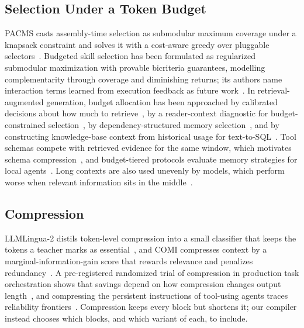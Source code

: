\subsection{Selection Under a Token Budget}
PACMS casts assembly-time selection as submodular maximum coverage under a knapsack constraint and solves it with a
cost-aware greedy over pluggable selectors~\citep{pacms2026}. Budgeted skill selection has been formulated as regularized
submodular maximization with provable bicriteria guarantees, modelling complementarity through coverage and
diminishing returns; its authors name interaction terms learned from execution feedback as future
work~\citep{skillselect2026}. In retrieval-augmented generation, budget allocation has been approached by calibrated
decisions about how much to retrieve~\citep{knowbefore2026}, by a reader-context diagnostic for budget-constrained
selection~\citep{recallnotenough2026}, by dependency-structured memory selection~\citep{contextweaver2026}, and by
constructing knowledge-base context from historical usage for text-to-SQL~\citep{beyondharness2026}. Tool schemas compete
with retrieved evidence for the same window, which motivates schema compression~\citep{toolschema2026}, and budget-tiered
protocols evaluate memory strategies for local agents~\citep{budgetbench2026}. Long contexts are also used unevenly by
models, which perform worse when relevant information sits in the middle~\citep{lostmiddle2024}.

\subsection{Compression}
LLMLingua-2 distils token-level compression into a small classifier that keeps the tokens a teacher marks as
essential~\citep{llmlingua2_2024}, and COMI compresses context by a marginal-information-gain score that rewards relevance
and penalizes redundancy~\citep{comi2026}. A pre-registered randomized trial of compression in production task orchestration
shows that savings depend on how compression changes output length~\citep{compressiontrial2026}, and compressing the
persistent instructions of tool-using agents traces reliability frontiers~\citep{controlcompression2026}. Compression keeps
every block but shortens it; our compiler instead chooses which blocks, and which variant of each, to include.

